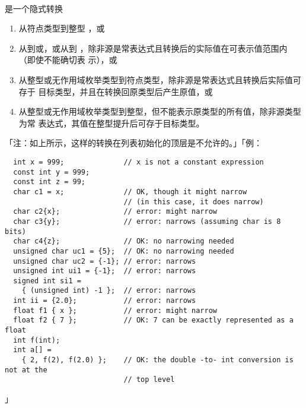 \paragraph{}
是一个隐式转换
\begin{enumerate}
  \item{从符点类型到整型 ，或}
  \item{从到或，或从到
    ，除非源是常表达式且转换后的实际值在可表示值范围内（即使不能确切表
    示），或}
  \item{从整型或无作用域枚举类型到符点类型，除非源是常表达式且转换后实际值可存于
    目标类型，并且在转换回原类型后产生原值，或}
  \item{从整型或无作用域枚举类型到整型，但不能表示原类型的所有值，除非源类型为常
    表达式，其值在整型提升后可存于目标类型。}
\end{enumerate}
「注：如上所示，这样的转换在列表初始化的顶层是不允许的。」「例：
\begin{lstlisting}
  int x = 999;              // x is not a constant expression
  const int y = 999;
  const int z = 99;
  char c1 = x;              // OK, though it might narrow
                            // (in this case, it does narrow)
  char c2{x};               // error: might narrow
  char c3{y};               // error: narrows (assuming char is 8 bits)
  char c4{z};               // OK: no narrowing needed
  unsigned char uc1 = {5};  // OK: no narrowing needed
  unsigned char uc2 = {-1}; // error: narrows
  unsigned int ui1 = {-1};  // error: narrows
  signed int si1 =
    { (unsigned int) -1 };  // error: narrows
  int ii = {2.0};           // error: narrows
  float f1 { x };           // error: might narrow
  float f2 { 7 };           // OK: 7 can be exactly represented as a float
  int f(int);
  int a[] =
    { 2, f(2), f(2.0) };    // OK: the double -to- int conversion is not at the
                            // top level
\end{lstlisting}」
